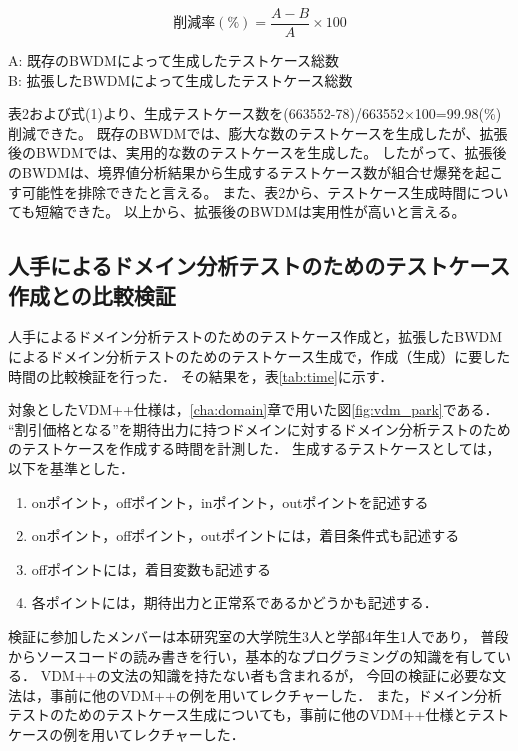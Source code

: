 \documentclass[uplatex, report, a4j, 10pt]{jsbook}
\begin{document}
\begin{equation}
  削減率(\%) = \frac{A - B}{A} \times 100
\end{equation}

\begin{center}
  A: 既存のBWDMによって生成したテストケース総数\\
  B: 拡張したBWDMによって生成したテストケース総数\\
\end{center}

表2および式(1)より、生成テストケース数を(663552-78)/663552×100=99.98(\%)削減できた。
既存のBWDMでは、膨大な数のテストケースを生成したが、拡張後のBWDMでは、実用的な数のテストケースを生成した。
したがって、拡張後のBWDMは、境界値分析結果から生成するテストケース数が組合せ爆発を起こす可能性を排除できたと言える。
また、表2から、テストケース生成時間についても短縮できた。
以上から、拡張後のBWDMは実用性が高いと言える。

\subsection{人手によるドメイン分析テストのためのテストケース作成との比較検証}

人手によるドメイン分析テストのためのテストケース作成と，拡張したBWDMによるドメイン分析テストのためのテストケース生成で，作成（生成）に要した時間の比較検証を行った．
その結果を，表\ref{tab:time}に示す．

対象としたVDM++仕様は，\ref{cha:domain}章で用いた図\ref{fig:vdm_park}である．
“割引価格となる”を期待出力に持つドメインに対するドメイン分析テストのためのテストケースを作成する時間を計測した．
生成するテストケースとしては，以下を基準とした．
\begin{enumerate}
 \item onポイント，offポイント，inポイント，outポイントを記述する
 \item onポイント，offポイント，outポイントには，着目条件式も記述する
 \item offポイントには，着目変数も記述する
 \item 各ポイントには，期待出力と正常系であるかどうかも記述する．
\end{enumerate}

検証に参加したメンバーは本研究室の大学院生3人と学部4年生1人であり，
普段からソースコードの読み書きを行い，基本的なプログラミングの知識を有している．
VDM++の文法の知識を持たない者も含まれるが，
今回の検証に必要な文法は，事前に他のVDM++の例を用いてレクチャーした．
また，ドメイン分析テストのためのテストケース生成についても，事前に他のVDM++仕様とテストケースの例を用いてレクチャーした．
\end{document}
